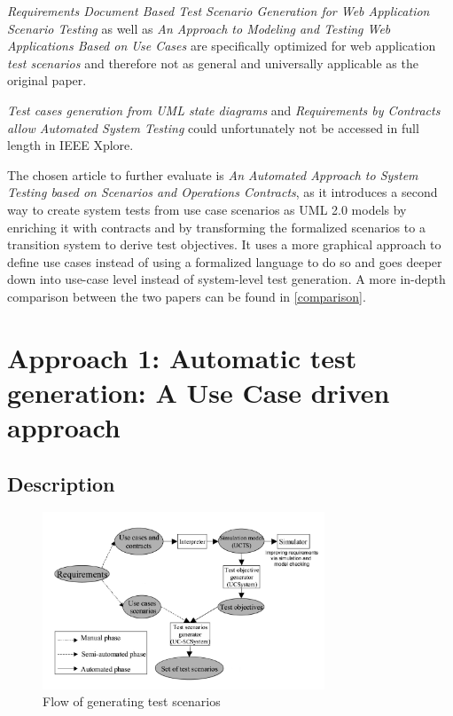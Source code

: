 \textit{Requirements Document Based Test Scenario Generation for Web Application Scenario Testing} as well as \textit{An Approach to Modeling and Testing Web Applications Based on Use Cases} are specifically optimized for web application \textit{test scenarios} and therefore not as general and universally applicable as the original paper.

\textit{Test cases generation from UML state diagrams} and \textit{Requirements by Contracts allow Automated System Testing} could unfortunately not be accessed in full length in IEEE Xplore.

The chosen article to further evaluate is \textit{An Automated Approach to System Testing based on Scenarios and Operations Contracts}, as it introduces a second way to create system tests from use case scenarios as UML 2.0 models by enriching it with contracts and by transforming the formalized scenarios to a transition system to derive test objectives. It uses a more graphical approach to define use cases instead of using a formalized language to do so and goes deeper down into use-case level instead of system-level test generation. A more in-depth comparison between the two papers can be found in \autoref{comparison}.

\section{Approach 1: Automatic test generation: A Use Case driven approach} \label{approachone}

\subsection{Description}

\begin{figure}[h]
	\centering
	\includegraphics[width=0.75\textwidth]{../images/topic3_transitionsystemflow.png}
	\caption{Flow of generating test scenarios \cite{ClementineNebut2006}}
	\label{tsf}
\end{figure}

